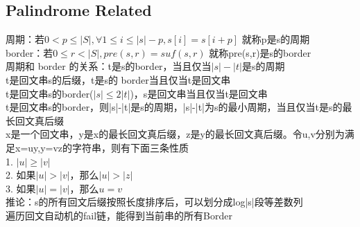 \documentclass[10pt]{ctexart}
\begin{document}
{\subsection{Palindrome Related}
周期：若$0 < p \leq |S|, {\forall}1 \leq i \leq{|s|-p}, s[i] = s[i+p]$ 就称p是s的周期\\
border：若$0 \leq r < |S|, pre(s, r) = suf(s,r)$ 就称pre(s,r)是s的border\\
周期和 border 的关系：t是s的border，当且仅当$|s| - |t|$是s的周期\\
t是回文串s的后缀，t是s的 border当且仅当t是回文串\\
t是回文串s的border($|s|\leq 2|t|$)，s是回文串当且仅当t是回文串\\
t是回文串s的border，则|s|-|t|是s的周期，|s|-|t|为s的最小周期，当且仅当t是s的最长回文真后缀\\
x是一个回文串，y是x的最长回文真后缀，z是y的最长回文真后缀。令u,v分别为满足x=uy,y=vz的字符串，则有下面三条性质\\
1. $|u| \geq |v|$\\
2. 如果$|u| > |v|$，那么$ |u| > |z|$\\
3. 如果$|u| = |v|$，那么$ u = v$\\
推论：s的所有回文后缀按照长度排序后，可以划分成log|s|段等差数列\\
遍历回文自动机的fail链，能得到当前串的所有Border\\

}
\end{document}
